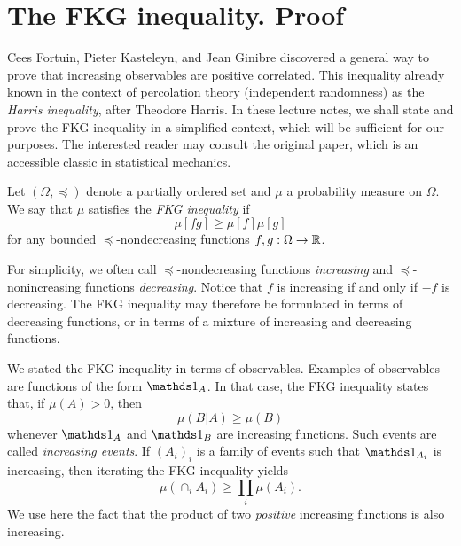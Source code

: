 \section{The FKG inequality. Proof}

Cees Fortuin, Pieter Kasteleyn, and Jean Ginibre discovered a general
way to prove that increasing observables are positive correlated.
This inequality already known in the context of percolation
theory (independent randomness) as the \emph{Harris inequality},
after Theodore Harris.
In these lecture notes, we shall state and prove the FKG inequality in a simplified
context, which will be sufficient for our purposes.
The interested reader may consult the original paper, which is an accessible classic in statistical mechanics.

\begin{definition}
    Let $(\Omega,\preceq)$ denote a partially ordered set
    and $\mu$ a probability measure on $\Omega$.
    We say that $\mu$ satisfies the \emph{FKG inequality}
    if
    \begin{equation}
        \label{eq:FKG}
        \mu[fg]\geq \mu[f]\mu[g]
    \end{equation}
    for any bounded $\preceq$-nondecreasing functions
    $f,g:\Omega\to\mathbb R$.
\end{definition}

For simplicity, we often call $\preceq$-nondecreasing functions \emph{increasing}
and $\preceq$-nonincreasing functions \emph{decreasing}.
Notice that $f$ is increasing if and only if $-f$ is decreasing.
The FKG inequality may therefore be formulated in terms of decreasing functions,
or in terms of a mixture of increasing and decreasing functions.

\begin{remark}
    We stated the FKG inequality in terms of observables.
    Examples of observables are functions of the form $\ind{A}$.
    In that case, the FKG inequality states that, if $\mu(A)>0$,
    then
    \[
        \mu(B|A)\geq \mu(B)
    \]
    whenever $\ind{A}$ and $\ind{B}$ are increasing functions.
    Such events are called \emph{increasing events}.
    If $(A_i)_i$ is a family of events such that $\ind{A_i}$ is increasing,
    then iterating the FKG inequality yields
    \[
        \mu(\cap_i A_i)\geq \prod_i\mu(A_i).
    \]
    We use here the fact that the product of two \emph{positive}
    increasing functions is also increasing.
\end{remark}

